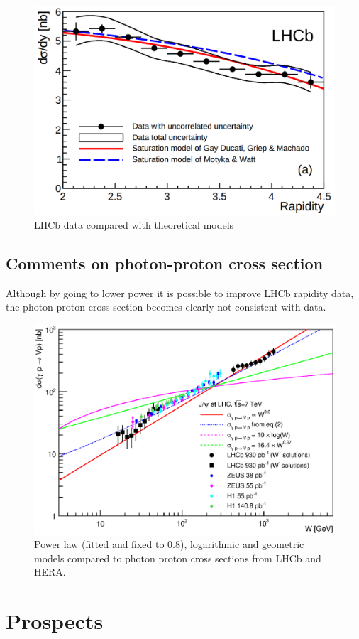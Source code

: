 \documentclass[12pt]{article}
\begin{document}
\begin{figure}[!h]
\centering
 \includegraphics[width=.8\textwidth]{figures/Magno.png}
 \caption{LHCb data compared with theoretical models}
\end{figure}


\clearpage
\subsection{Comments on photon-proton cross section}
Although by going to lower power it is possible to improve LHCb rapidity data, the photon proton cross section becomes clearly not consistent with data.
\begin{figure}[!h]
\centering
 \includegraphics[width=.8\textwidth]{figures/sigma_gamma_p_W_all_theory.eps}
 \caption{Power law (fitted and fixed to 0.8), logarithmic and geometric models compared to photon proton cross sections from LHCb and HERA.}
\end{figure}

\section{Prospects}
\end{document}
